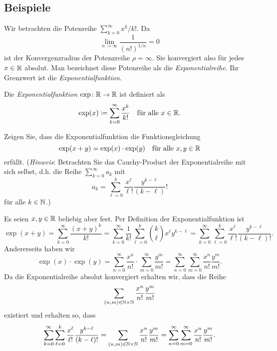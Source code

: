 \documentclass[a4paper,10pt]{article}
\begin{document}
\subsection{Beispiele}


Wir betrachten die Potenreihe $\sum_{k=0}^\infty x^k/k!$. Da
\[
 \lim_{n \to \infty} \frac{1}{(n!)^{1/n}}
 = 0
\]
ist der Konvergenzradius der Potenzreihe $\rho = \infty$. Sie konvergiert also für jedes $x \in \mathbb{R}$ absolut. Man bezeichnet diese Potenreihe als die \emph{Exponentialreihe}. Ihr Grenzwert ist die \emph{Exponentialfunktion}.


\begin{defi}
 Die \emph{Exponentialfunktion} $\exp \colon \mathbb{R} \to \mathbb{R}$ ist definiert als
 \[
  \exp(x) \coloneqq \sum_{k=0}^\infty \frac{x^k}{k!} \quad \text{für alle $x \in \mathbb{R}$}.
 \]
\end{defi}


\begin{question}
 Zeigen Sie, dass die Exponentialfunktion die Funktionsgleichung
 \[
  \exp(x+y) = \exp(x) \cdot \exp(y) \quad \text{für alle $x,y \in \mathbb{R}$}
 \]
 erfüllt. (\emph{Hinweis}: Betrachten Sie das Cauchy-Product der Exponentialreihe mit sich selbst, d.h. die Reihe $\sum_{k=0}^\infty a_k$ mit
 \[
  a_k = \sum_{\ell=0}^k \frac{x^\ell}{\ell!} \frac{y^{k-\ell}}{(k-\ell)}!
 \]
 für alle $k \in \mathbb{N}$.)
\end{question}
\begin{solution}
 Es seien $x,y \in \mathbb{R}$ beliebig aber fest. Per Definition der Exponentialfunktion ist
 \[
  \exp(x+y)
  = \sum_{k=0}^\infty \frac{(x+y)^k}{k!}
  = \sum_{k=0}^\infty \frac{1}{k!} \sum_{\ell=0}^k \binom{k}{\ell} x^\ell y^{k-\ell}
  = \sum_{k=0}^\infty \sum_{\ell=0}^k \frac{x^\ell}{\ell!} \frac{y^{k-\ell}}{(k-\ell)!}.
 \]
 Andererseits haben wir
 \[
  \exp(x) \cdot \exp(y)
  = \sum_{n=0}^\infty \frac{x^n}{n!} \cdot \sum_{m=0}^\infty \frac{y^m}{m!}
  = \sum_{n=0}^\infty \sum_{m=0}^\infty \frac{x^n}{n!} \frac{y^m}{m!}.
 \]
 Da die Exponentialreihe absolut konvergiert erhalten wir, dass die Reihe
 \[
  \sum_{(n,m) \in \mathbb{N} \times \mathbb{N}} \frac{x^n}{n!} \frac{y^m}{m!}
 \]
 existiert und erhalten so, dass
 \[
  \sum_{k=0}^\infty \sum_{\ell=0}^k \frac{x^\ell}{\ell!} \frac{y^{k-\ell}}{(k-\ell)!}
  = \sum_{(n,m) \in \mathbb{N} \times \mathbb{N}} \frac{x^n}{n!} \frac{y^m}{m!}
  = \sum_{n=0}^\infty \sum_{m=0}^\infty \frac{x^n}{n!} \frac{y^m}{m!}.
 \]
\end{solution}
\end{document}
